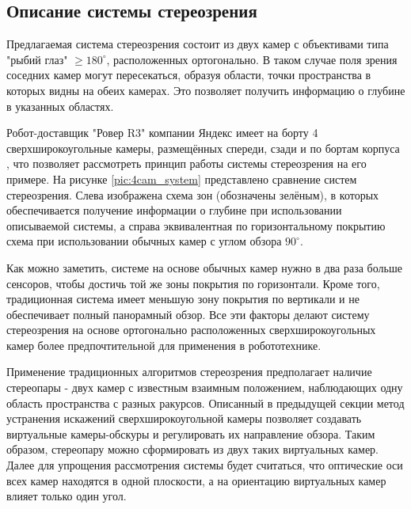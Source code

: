 \subsection{Описание системы стереозрения}

Предлагаемая система стереозрения состоит из двух камер с объективами типа "рыбий глаз" $\geqslant 180^\circ$,
расположенных ортогонально. В таком случае поля зрения соседних камер могут пересекаться, 
образуя  области, точки пространства в которых видны на обеих камерах. Это позволяет получить информацию о 
глубине в указанных областях. %

Робот-доставщик "Ровер R3"  компании Яндекс имеет на борту 4 сверхширокоугольные камеры, размещённых спереди, сзади и по бортам 
корпуса \cite{yandex_rover}, что позволяет рассмотреть принцип работы системы стереозрения на его примере. На рисунке \ref{pic:4cam_system} 
представлено сравнение систем стереозрения. Слева изображена схема зон (обозначены зелёным), в которых обеспечивается получение информации о глубине
 при использовании описываемой системы, а справа эквивалентная по горизонтальному  покрытию схема при использовании обычных камер 
 с углом обзора $90^\circ$. 
 

Как можно заметить, системе на основе обычных камер нужно в два раза больше сенсоров, чтобы достичь той же зоны покрытия 
по горизонтали.  Кроме того, традиционная система имеет меньшую зону покрытия по вертикали и не обеспечивает полный 
панорамный обзор. Все эти факторы делают систему стереозрения на основе ортогонально расположенных сверхширокоугольных камер 
более предпочтительной для применения в робототехнике.  %

Применение традиционных алгоритмов стереозрения предполагает наличие стереопары - двух камер с известным взаимным положением,   %
наблюдающих  одну область пространства с разных ракурсов. Описанный в предыдущей секции метод  устранения искажений 
сверхширокоугольной камеры позволяет создавать виртуальные камеры-обскуры и регулировать их направление обзора. Таким образом,
стереопару можно сформировать из двух таких виртуальных камер.  %
Далее для упрощения рассмотрения системы будет считаться, что оптические оси всех камер находятся в одной плоскости, 
а на ориентацию виртуальных камер влияет только один угол. %

